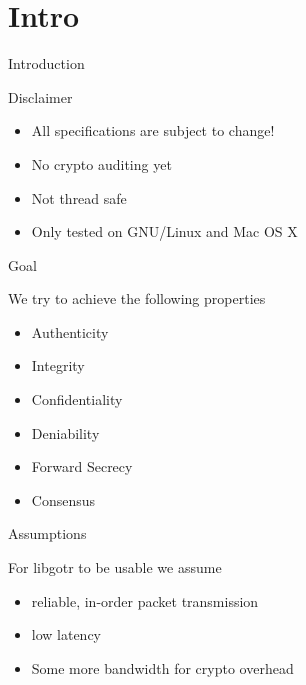 \section{Intro}
\begin{frame}{Introduction}
	\begin{alertblock}{Disclaimer}
		\begin{itemize}
			\item All specifications are subject to change!
			\item No crypto auditing yet
			\item Not thread safe
			\item Only tested on GNU/Linux and Mac OS X
		\end{itemize}
	\end{alertblock}
\end{frame}

\begin{frame}{Goal}
	\begin{block}{We try to achieve the following properties}
		\begin{itemize}
			\item Authenticity
			\item Integrity
			\item Confidentiality
			\item Deniability
			\item Forward Secrecy
			\item Consensus
		\end{itemize}
	\end{block}
\end{frame}

\begin{frame}{Assumptions}
	\begin{block}{For libgotr to be usable we assume}
		\begin{itemize}
			\item reliable, in-order packet transmission
			\item low latency
			\item Some more bandwidth for crypto overhead
		\end{itemize}
	\end{block}
\end{frame}
